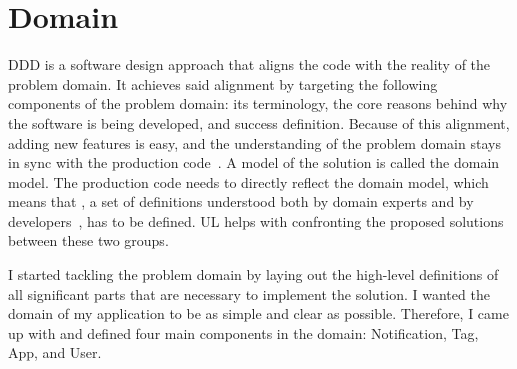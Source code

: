 \section{Domain}\label{sec:domain}

\Ac{DDD} is a software design approach
that aligns the code with the reality
of the problem domain.
It achieves said alignment by targeting
the following components of the problem domain:
its terminology,
the core reasons behind why the software is being developed,
and success definition.
Because of this alignment,
adding new features is easy,
and the understanding of the problem domain
stays in sync with the production code~\cite{millett_patterns_2015}.
A model of the solution is called the domain model.
The production code needs to directly reflect the domain model,
which means that ,
a set of definitions
understood both by domain experts
and by developers~\cite{evans_domain-driven_2003,millett_patterns_2015},
has to be defined.
\Ac{UL} helps with confronting the proposed solutions
between these two groups.

I started tackling the problem domain by
laying out the high-level definitions
of all significant parts
that are necessary to implement the solution.
I wanted the domain of my application
to be as simple and clear as possible.
Therefore,
I came up with 
and defined four main components in the domain: Notification, Tag, App, and User.





